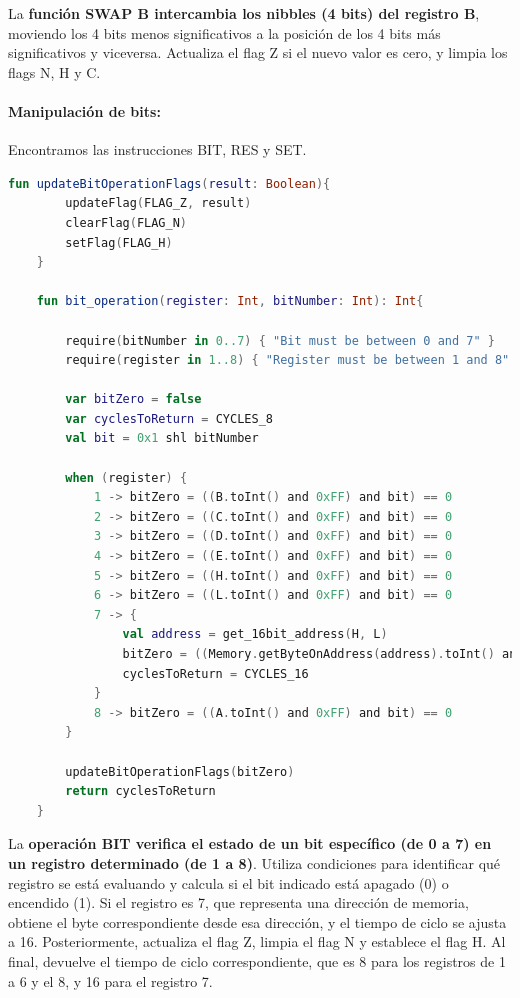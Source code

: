 La \textbf{función SWAP B intercambia los nibbles (4 bits) del registro B}, moviendo los 4 bits menos significativos a la posición de los 4 bits más significativos y viceversa. Actualiza el flag Z si el nuevo valor es cero, y limpia los flags N, H y C.

\paragraph{Manipulación de bits:} Encontramos las instrucciones BIT, RES y SET.

\begin{lstlisting}[language=Kotlin, caption={Operación BIT}, label={code:kotlinbit}]
    fun updateBitOperationFlags(result: Boolean){
        updateFlag(FLAG_Z, result)
        clearFlag(FLAG_N)
        setFlag(FLAG_H)
    }

    fun bit_operation(register: Int, bitNumber: Int): Int{

        require(bitNumber in 0..7) { "Bit must be between 0 and 7" }
        require(register in 1..8) { "Register must be between 1 and 8" }

        var bitZero = false
        var cyclesToReturn = CYCLES_8
        val bit = 0x1 shl bitNumber

        when (register) {
            1 -> bitZero = ((B.toInt() and 0xFF) and bit) == 0
            2 -> bitZero = ((C.toInt() and 0xFF) and bit) == 0
            3 -> bitZero = ((D.toInt() and 0xFF) and bit) == 0
            4 -> bitZero = ((E.toInt() and 0xFF) and bit) == 0
            5 -> bitZero = ((H.toInt() and 0xFF) and bit) == 0
            6 -> bitZero = ((L.toInt() and 0xFF) and bit) == 0
            7 -> {
                val address = get_16bit_address(H, L)
                bitZero = ((Memory.getByteOnAddress(address).toInt() and 0xFF) and bit) == 0
                cyclesToReturn = CYCLES_16
            }
            8 -> bitZero = ((A.toInt() and 0xFF) and bit) == 0
        }

        updateBitOperationFlags(bitZero)
        return cyclesToReturn
    }
\end{lstlisting}

La \textbf{operación BIT verifica el estado de un bit específico (de 0 a 7) en un registro determinado (de 1 a 8)}. Utiliza condiciones para identificar qué registro se está evaluando y calcula si el bit indicado está apagado (0) o encendido (1). Si el registro es 7, que representa una dirección de memoria, obtiene el byte correspondiente desde esa dirección, y el tiempo de ciclo se ajusta a 16. Posteriormente, actualiza el flag Z, limpia el flag N y establece el flag H. Al final, devuelve el tiempo de ciclo correspondiente, que es 8 para los registros de 1 a 6 y el 8, y 16 para el registro 7.

